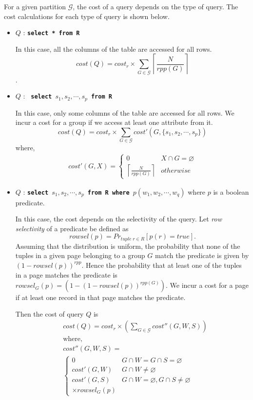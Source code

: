 \documentclass[twocolumn,11pt]{article}
\newcommand{\g}{\mathcal{G}}
\newcommand{\sql}[1]{{\tt \textbf{#1}}}
\begin{document}
For a given partition $\g$, the cost of a query depends on the type of query.
The cost calculations for each type of query is shown below.

\begin{itemize}
	\item $Q$ : \sql{select * from R}
	
	In this case, all the columns of the table are accessed for all rows.
	\[ cost(Q) =  cost_r \times \sum_{G \in \g} \left\lceil \frac{N}{rpp(G)} \right\rceil \].

	\item $Q$ : \sql{ select $s_1,s_2,\cdots,s_p$ from R}
	
	In this case, only some columns of the table are accessed for all
	rows. We incur a cost for a group if we access at least one attribute
	from it.
	\[ cost(Q) = cost_r \times \sum_{G \in \g} cost'(G,\{s_1,s_2,\cdots,s_p\}) \]
	where,
	\begin{align*}
	cost'(G,X) = \begin{cases}
		0 											&	X \cap G = \varnothing \\
		\left\lceil \frac{N}{rpp(G)} \right\rceil	&	otherwise
	\end{cases}
	\end{align*}
	
	\item $Q$ : \sql{select $s_1,s_2,\cdots,s_p$ from R where $p(w_1,w_2,\cdots,w_q)$}
	where $p$ is a boolean predicate.
	
	In this case, the cost depends on the selectivity of the query.
	Let {\em row selectivity} of a predicate be defined as
	\[ rowsel(p) = Pr_{tuple\;r \in R}\left[ p(r) = true \right]. \]
	Assuming that the distribution is uniform, the probability that
	none of the tuples in a given page belonging to a group $G$ match
	the predicate is given by $(1-rowsel(p))^{rpp}$. Hence the
	probability that at least one of the tuples in a page matches the predicate is
	$rowsel_G(p) = (1-(1-rowsel(p))^{rpp(G)})$. We incur a cost for
	a page if at least one record in that page matches the predicate.
	
	Then the cost of query $Q$ is
	\begin{align*}
		&cost(Q) = cost_r \times ( \sum_{G \in \g} cost''(G,W,S) ) \\
		&\text{where,} \\
		&cost''(G,W,S) = \\
		&\begin{cases}
			0			& G \cap W = G \cap S = \varnothing \\
			cost'(G,W)	& G \cap W \neq \varnothing \\
			cost'(G,S)  & G \cap W = \varnothing, G \cap S \neq \varnothing \\
			\times rowsel_G(p)
		\end{cases}
	\end{align*}
	

\end{itemize}
\end{document}

